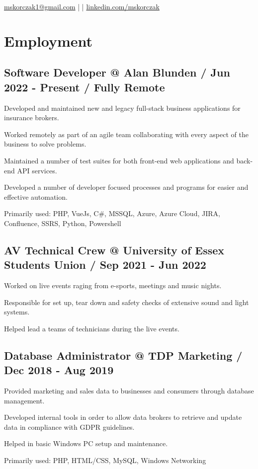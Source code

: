 \documentclass{article}
\makeatletter
\newcommand{\github}{https://mskor.xyz/git/mskor}
\renewcommand{\maketitle}
{
\begin{center}
{\fontsize{15}{10}\bfseries
\theauthor
}
\vspace{.5em}

    \href{mskorczak1@gmail.com}{mskorczak1@gmail.com} | \href{\github}{} | \href{www.linkedin.com/in/mskorczak}{linkedin.com/mskorczak}

\end{center}
}
\makeatother
\begin{document}
\author{Michal Skorczak}

\maketitle

\section{Employment}

\subsection{Software Developer @ Alan Blunden / Jun 2022 - Present / Fully Remote}
\begin{compactitem}
\item Developed and maintained new and legacy full-stack business applications for insurance brokers.
\item Worked remotely as part of an agile team collaborating with every aspect of the business to solve problems.
\item Maintained a number of test suites for both front-end web applications and back-end API services.
\item Developed a number of developer focused processes and programs for easier and effective automation.
\item Primarily used: PHP, VueJs, C#, MSSQL, Azure, Azure Cloud, JIRA, Confluence, SSRS, Python, Powershell
\end{compactitem}

\subsection{AV Technical Crew @ University of Essex Students Union / Sep 2021 - Jun 2022}
\begin{compactitem}
\item Worked on live events raging from e-sports, meetings and music nights.
\item Responsible for set up, tear down and safety checks of extensive sound and light systems.
\item Helped lead a teams of technicians during the live events.
\end{compactitem}

\subsection{Database Administrator @ TDP Marketing / Dec 2018 - Aug 2019}
\begin{compactitem}
\item Provided marketing and sales data to businesses and consumers through database management.
\item Developed internal tools in order to allow data brokers to retrieve and update data in compliance with GDPR guidelines.
\item Helped in basic Windows PC setup and maintenance.
\item Primarily used: PHP, HTML/CSS, MySQL, Windows Networking 
\end{compactitem}
\end{document}
